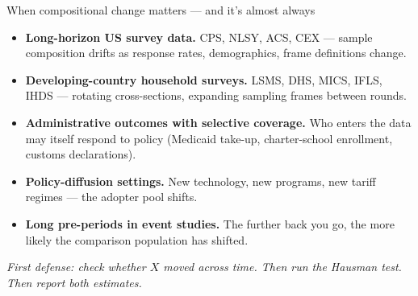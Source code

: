 \documentclass[aspectratio=169,11pt]{beamer}
\begin{document}
\begin{frame}{When compositional change matters --- and it's almost always}
\vspace{0.4em}
\begin{itemize}\small
  \item \textbf{Long-horizon US survey data.} CPS, NLSY, ACS, CEX --- sample composition drifts as response rates, demographics, frame definitions change.
  \item \textbf{Developing-country household surveys.} LSMS, DHS, MICS, IFLS, IHDS --- rotating cross-sections, expanding sampling frames between rounds.
  \item \textbf{Administrative outcomes with selective coverage.} Who enters the data may itself respond to policy (Medicaid take-up, charter-school enrollment, customs declarations).
  \item \textbf{Policy-diffusion settings.} New technology, new programs, new tariff regimes --- the adopter pool shifts.
  \item \textbf{Long pre-periods in event studies.} The further back you go, the more likely the comparison population has shifted.
\end{itemize}
\vspace{0.2em}
\begin{center}
\small\color{warmgray}\itshape
First defense: check whether $X$ moved across time. \;Then run the Hausman test. \;Then report both estimates.
\end{center}
\end{frame}

\end{document}
